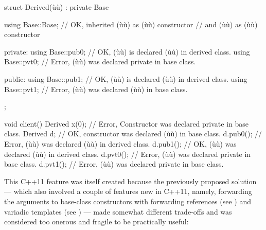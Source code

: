 \begin{emcppslisting}[emcppsbatch=e13]
struct Derived(ù{\footnotemark}ù) : private Base
{
    using Base::Base;  // OK, inherited (ù{}ù) as (ù{}ù) constructor
                       // and (ù{}ù) as (ù{}ù) constructor

private:
    using Base::pub0;  // OK, (ù{}ù) is declared (ù{}ù) in derived class.
    using Base::pvt0;  // Error, (ù{}ù) was declared private in base class.

public:
    using Base::pub1;  // OK, (ù{}ù) is declared (ù{}ù) in derived class.
    using Base::pvt1;  // Error, (ù{}ù) was declared (ù{}ù) in base class.
};

void client()
{
     Derived x(0);  // Error, Constructor was declared private in base class.
     Derived d;     // OK, constructor was declared (ù{}ù) in base class.
     d.pub0();      // Error, (ù{}ù) was declared (ù{}ù) in derived class.
     d.pub1();      // OK, (ù{}ù) was declared (ù{}ù) in derived class.
     d.pvt0();      // Error, (ù{}ù) was declared private in base class.
     d.pvt1();      // Error, (ù{}ù) was declared private in base class.
}
\end{emcppslisting}
{\cprotect{}}
    
\noindent This C++11 feature was itself created because the previously proposed
solution --- which also involved a couple of features new in C++11, namely,
forwarding the arguments to base-class constructors with
forwarding references (see ) 
and variadic
templates (see ) 
--- made somewhat different trade-offs and was
considered too onerous and fragile to be practically useful:

